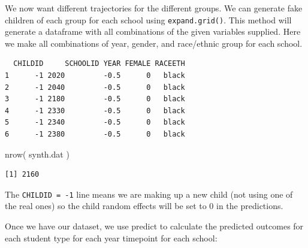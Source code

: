 \documentclass[
  letterpaper,
  DIV=11,
  numbers=noendperiod]{scrreprt}
\newenvironment{Shaded}{\begin{snugshade}}{\end{snugshade}}
\newcommand{\AttributeTok}[1]{\textcolor[rgb]{0.49,0.56,0.16}{#1}}
\newcommand{\DecValTok}[1]{\textcolor[rgb]{0.25,0.63,0.44}{#1}}
\newcommand{\FunctionTok}[1]{\textcolor[rgb]{0.02,0.16,0.49}{#1}}
\newcommand{\NormalTok}[1]{\textcolor[rgb]{0.00,0.44,0.13}{#1}}
\newcommand{\OtherTok}[1]{\textcolor[rgb]{0.00,0.44,0.13}{#1}}
\newcommand{\SpecialCharTok}[1]{\textcolor[rgb]{0.25,0.44,0.63}{#1}}
\begin{document}
We now want different trajectories for the different groups. We can
generate fake children of each group for each school using
\texttt{expand.grid()}. This method will generate a dataframe with all
combinations of the given variables supplied. Here we make all
combinations of year, gender, and race/ethnic group for each school.

\begin{Shaded}
\end{Shaded}

\begin{verbatim}
  CHILDID     SCHOOLID YEAR FEMALE RACEETH
1      -1 2020         -0.5      0   black
2      -1 2040         -0.5      0   black
3      -1 2180         -0.5      0   black
4      -1 2330         -0.5      0   black
5      -1 2340         -0.5      0   black
6      -1 2380         -0.5      0   black
\end{verbatim}

\begin{Shaded}
\begin{Highlighting}[]
\FunctionTok{nrow}\NormalTok{( synth.dat )}
\end{Highlighting}
\end{Shaded}

\begin{verbatim}
[1] 2160
\end{verbatim}

The \texttt{CHILDID\ =\ -1} line means we are making up a new child (not
using one of the real ones) so the child random effects will be set to 0
in the predictions.

Once we have our dataset, we use predict to calculate the predicted
outcomes for each student type for each year timepoint for each school:
\end{document}
